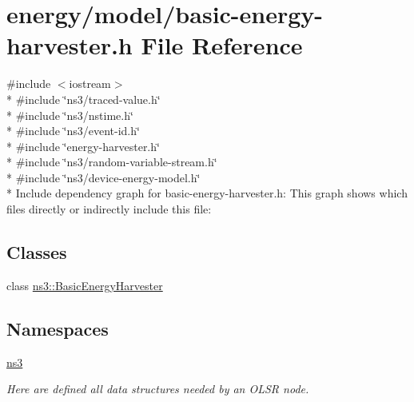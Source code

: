 \hypertarget{basic-energy-harvester_8h}{}\section{energy/model/basic-\/energy-\/harvester.h File Reference}
\label{basic-energy-harvester_8h}
{\ttfamily \#include $<$iostream$>$}\\*
{\ttfamily \#include \char`\"{}ns3/traced-\/value.\+h\char`\"{}}\\*
{\ttfamily \#include \char`\"{}ns3/nstime.\+h\char`\"{}}\\*
{\ttfamily \#include \char`\"{}ns3/event-\/id.\+h\char`\"{}}\\*
{\ttfamily \#include \char`\"{}energy-\/harvester.\+h\char`\"{}}\\*
{\ttfamily \#include \char`\"{}ns3/random-\/variable-\/stream.\+h\char`\"{}}\\*
{\ttfamily \#include \char`\"{}ns3/device-\/energy-\/model.\+h\char`\"{}}\\*
Include dependency graph for basic-\/energy-\/harvester.h\+:
This graph shows which files directly or indirectly include this file\+:
\subsection*{Classes}
\begin{DoxyCompactItemize}
\item 
class \hyperlink{classns3_1_1BasicEnergyHarvester}{ns3\+::\+Basic\+Energy\+Harvester}
\end{DoxyCompactItemize}
\subsection*{Namespaces}
\begin{DoxyCompactItemize}
\item 
 \hyperlink{namespacens3}{ns3}
\begin{DoxyCompactList}\small\item\em Here are defined all data structures needed by an O\+L\+SR node. \end{DoxyCompactList}\end{DoxyCompactItemize}
